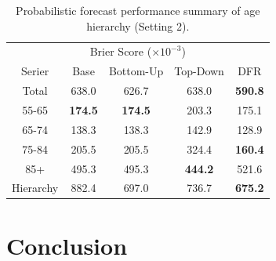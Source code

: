 \documentclass[a4paper,review,12pt,authoryear]{elsarticle}
\begin{document}
\begin{table}[h]
  \centering
  \caption{\label{tab:mortality_age2} Probabilistic forecast performance summary of age hierarchy (Setting 2).}
  \begin{tabular}{ccccc}
  \toprule
  \multicolumn{5}{c}{Brier Score ($\times 10^{-3}$)}\\ 
  Serier & Base & Bottom-Up & Top-Down & DFR \\\midrule
  Total & 638.0 & 626.7 & 638.0 & \textbf{590.8} \\
  55-65 & \textbf{174.5} & \textbf{174.5} & 203.3 & 175.1 \\
  65-74 & 138.3 & 138.3 & 142.9 & 128.9\\
  75-84 & 205.5 & 205.5 & 324.4 & \textbf{160.4}\\
  85+ & 495.3 & 495.3 & \textbf{444.2} & 521.6\\
  Hierarchy & 882.4 & 697.0 & 736.7 & \textbf{675.2} \\
  \bottomrule
 \end{tabular}
\end{table}

\section{Conclusion}
\label{sec:conclusion}


\newpage



\end{document}

